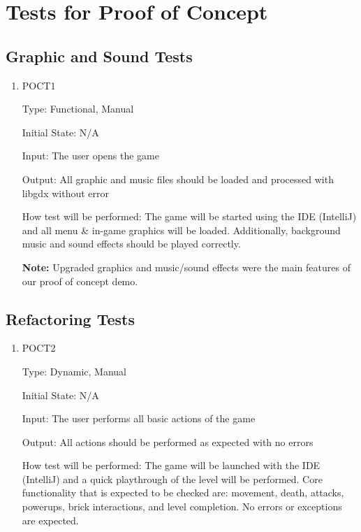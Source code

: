 \documentclass[12pt, titlepage]{article}
\begin{document}
\section{Tests for Proof of Concept}

\subsection{Graphic and Sound Tests}


\begin{enumerate}

\item{POCT1\\}

Type: Functional, Manual

Initial State: N/A

Input: The user opens the game

Output: All graphic and music files should be loaded and processed with libgdx without error

How test will be performed: The game will be started using the IDE (IntelliJ) and all menu \& in-game graphics will be loaded. Additionally, background music and sound effects should be played correctly.

\textbf{Note:} Upgraded graphics and music/sound effects were the main features of our proof of concept demo.

\end{enumerate}

\subsection{Refactoring Tests}

\begin{enumerate}

\item{POCT2\\}

Type: Dynamic, Manual

Initial State: N/A

Input: The user performs all basic actions of the game

Output: All actions should be performed as expected with no errors

How test will be performed: The game will be launched with the IDE (IntelliJ) and a quick playthrough of the level will be performed. Core functionality that is expected to be checked are: movement, death, attacks, powerups, brick interactions, and level completion. No errors or exceptions are expected.

\end{enumerate}
\end{document}

